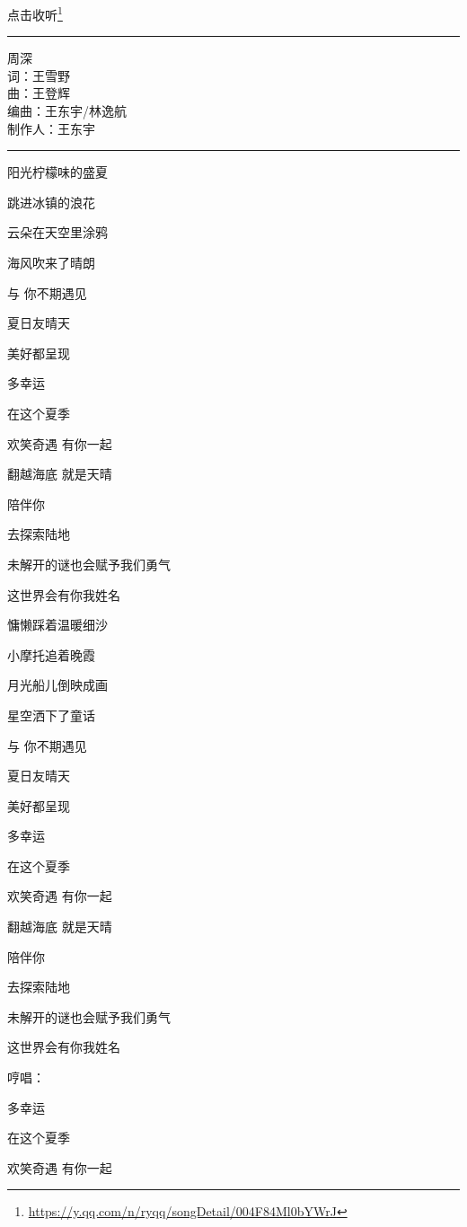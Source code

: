 \documentclass[]{ctexbook}
\renewcommand{\href}[2]{#2\footnote{\url{#1}}}
\begin{document}
\href{https://y.qq.com/n/ryqq/songDetail/004F84Ml0bYWrJ}{点击收听}

\begin{center}\rule{0.5\linewidth}{0.5pt}\end{center}

周深\\
词：王雪野\\
曲：王登辉\\
编曲：王东宇/林逸航\\
制作人：王东宇

\begin{center}\rule{0.5\linewidth}{0.5pt}\end{center}

阳光柠檬味的盛夏

跳进冰镇的浪花

云朵在天空里涂鸦

海风吹来了晴朗

与 你不期遇见

夏日友晴天

美好都呈现

多幸运

在这个夏季

欢笑奇遇 有你一起

翻越海底 就是天晴

陪伴你

去探索陆地

未解开的谜也会赋予我们勇气

这世界会有你我姓名

慵懒踩着温暖细沙

小摩托追着晚霞

月光船儿倒映成画

星空洒下了童话

与 你不期遇见

夏日友晴天

美好都呈现

多幸运

在这个夏季

欢笑奇遇 有你一起

翻越海底 就是天晴

陪伴你

去探索陆地

未解开的谜也会赋予我们勇气

这世界会有你我姓名

哼唱：

多幸运

在这个夏季

欢笑奇遇 有你一起
\end{document}
